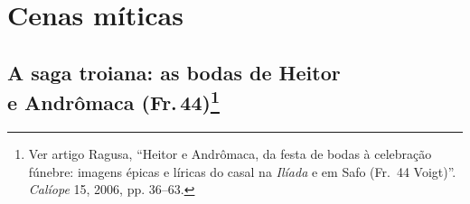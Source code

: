 \chapter{Cenas míticas}

\section[A saga troiana: as bodas de Heitor e Andrômaca (Fr.\,44)]{A saga troiana: as bodas de Heitor\\e Andrômaca (Fr.\,44)\protect\footnote{\MakeUppercase{V}er
artigo \MakeUppercase{R}agusa, ``\MakeUppercase{H}eitor e \MakeUppercase{A}ndrômaca, da festa de bodas à celebração fúnebre:
imagens épicas e líricas do casal na \textit{\MakeUppercase{I}líada} e em \MakeUppercase{S}afo (\MakeUppercase{F}r.~44 Voigt)''.
\textit{\MakeUppercase{C}alíope} 15, 2006, pp. 36--63.}}

